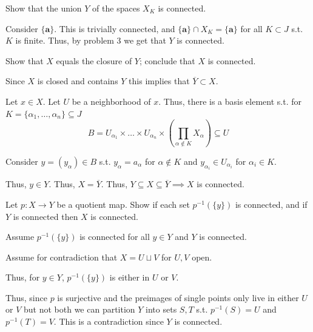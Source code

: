 \begin{subproblem}{}
    Show that the union $Y$ of the spaces $X_K$ is connected.
\end{subproblem}
\begin{problemproof}
    Consider $\{\mathbf{a}\}$. This is trivially connected, and $\{\mathbf{a}\} \cap X_K=\{\mathbf{a}\}$ for all $K \subset J$ s.t. $K$ is finite. Thus, by problem 3 we get that $Y$ is connected.
\end{problemproof}

\begin{subproblem}{}
    Show that $X$ equals the closure of $Y$; conclude that $X$ is connected.
\end{subproblem}
\begin{problemproof}
    Since $X$ is closed and contains $Y$ this implies that $\overline{Y} \subset X$.

    Let $x \in X$. Let $U$ be a neighborhood of $x$. Thus, there is a basis element s.t. for $K=\{\alpha_1,\dots,\alpha_n\} \subseteq J$
    \[B=U_{\alpha_1} \times \dots \times U_{\alpha_n} \times (\prod_{\alpha \notin K}X_\alpha) \subseteq U\]

    Consider $y=(y_\alpha) \in B$ s.t. $y_\alpha=a_\alpha$ for $\alpha \notin K$ and $y_{\alpha_i} \in U_{\alpha_i}$ for $\alpha_i \in K$.

    Thus, $y \in Y$. Thus, $X = \overline{Y}$. Thus, $Y \subseteq  X \subseteq \overline{Y} \implies X$ is connected.
\end{problemproof}

\vspace{1in}
\begin{pb}{}
    Let $p: X \to Y$ be a quotient map. Show if each set $p^{-1}(\{y\})$ is connected, and if $Y$ is connected then $X$ is connected.
\end{pb}
\begin{problemproof}
    Assume $p^{-1}(\{y\})$ is connected for all $y \in Y$ and $Y$ is connected.

    Assume for contradiction that $X=U \sqcup V$ for $U,V$ open.
    
    Thus, for $y \in Y$, $p^{-1}(\{y\})$ is either in $U$ or $V$.

    Thus, since $p$ is surjective and the preimages of single points only live in either $U$ or $V$ but not both we can partition $Y$ into sets $S,T$ s.t. $p^{-1}(S)=U$ and $p^{-1}(T)=V$. This is a contradiction since $Y$ is connected.
\end{problemproof}

